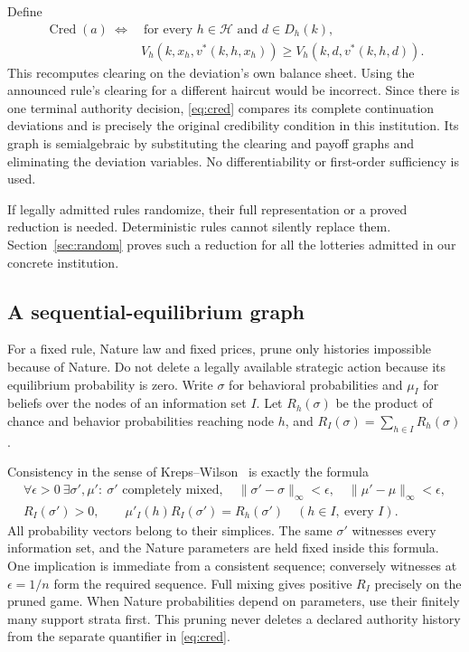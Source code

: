 \documentclass[11pt,a4paper]{article}
\numberwithin{equation}{section}
\theoremstyle{definition}
\newcommand{\Cred}{\operatorname{Cred}}
\begin{document}
Define
\begin{equation}\label{eq:cred}
\begin{aligned}
\Cred(a)\ \Longleftrightarrow&
\ \text{for every }h\in\mathcal H\text{ and }d\in D_h(k),\\
&V_h(k,x_h,v^*(k,h,x_h))\ge V_h(k,d,v^*(k,h,d)).
\end{aligned}
\end{equation}
This recomputes clearing on the deviation's own balance sheet. Using the
announced rule's clearing for a different haircut would be incorrect.
Since there is one terminal authority decision, \eqref{eq:cred} compares
its complete continuation deviations and is precisely the original
credibility condition in this institution. Its graph is semialgebraic by
substituting the clearing and payoff graphs and eliminating the deviation
variables. No differentiability or first-order sufficiency is used.

If legally admitted rules randomize, their full representation or a proved
reduction is needed. Deterministic rules cannot silently replace them.
Section~\ref{sec:random} proves such a reduction for all the lotteries
admitted in our concrete institution.

\subsection{A sequential-equilibrium graph}
For a fixed rule, Nature law and fixed prices, prune only histories
impossible because of Nature. Do not delete a legally available strategic
action because its equilibrium probability is zero. Write \(\sigma\) for
behavioral probabilities and \(\mu_I\) for beliefs over the nodes of an
information set \(I\). Let \(R_h(\sigma)\) be the product of chance and
behavior probabilities reaching node \(h\), and
\(R_I(\sigma)=\sum_{h\in I}R_h(\sigma)\).

Consistency in the sense of Kreps--Wilson~\cite{kw} is exactly the formula
\begin{equation}\label{eq:consistency}
\begin{gathered}
\forall \epsilon>0\ \exists \sigma',\mu':\
\sigma'\text{ completely mixed},\quad
\|\sigma'-\sigma\|_\infty<\epsilon,\quad
\|\mu'-\mu\|_\infty<\epsilon,\\
R_I(\sigma')>0,\qquad
\mu'_I(h)R_I(\sigma')=R_h(\sigma')
               \quad(h\in I,\ \text{every }I).
\end{gathered}
\end{equation}
All probability vectors belong to their simplices. The same \(\sigma'\)
witnesses every information set, and the Nature parameters are held fixed
inside this formula. One implication is immediate from a consistent
sequence; conversely witnesses at \(\epsilon=1/n\) form the required
sequence. Full mixing gives positive \(R_I\) precisely on the pruned game.
When Nature probabilities depend on parameters, use their finitely many
support strata first. This pruning never deletes a declared authority
history from the separate quantifier in \eqref{eq:cred}.
\end{document}
